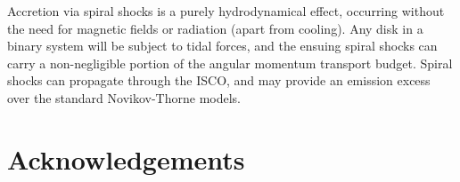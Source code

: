 \documentclass{emulateapj}
\begin{document}
Accretion via spiral shocks is a purely hydrodynamical effect, occurring without the need for magnetic fields or radiation (apart from cooling).  Any disk in a binary system will be subject to tidal forces, and the ensuing spiral shocks can carry a non-negligible portion of the angular momentum transport budget.  Spiral shocks can propagate through the ISCO, and may provide an emission excess over the standard Novikov-Thorne models.


\section{Acknowledgements}


\newpage





%
\end{document}
